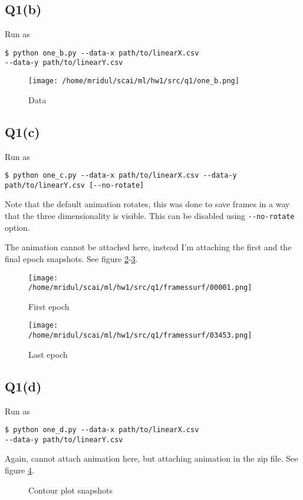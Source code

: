 \documentclass[11pt]{article}
\begin{document}
\subsection{Q1(b)}
\label{sec:org2e4e985}
\begin{codebox}
Run as
\begin{verbatim}
$ python one_b.py --data-x path/to/linearX.csv
--data-y path/to/linearY.csv
\end{verbatim}
\end{codebox}
\begin{figure}[!ht]
\centering
\texttt{[image: /home/mridul/scai/ml/hw1/src/q1/one\_b.png]}
\caption{\label{fig:org2bc820c}Data}
\end{figure}
\subsection{Q1(c)}
\label{sec:org2afdae8}
\begin{codebox}
Run as
\begin{verbatim}
$ python one_c.py --data-x path/to/linearX.csv --data-y
path/to/linearY.csv [--no-rotate]
\end{verbatim}
Note that the default animation rotates, this was done to
save frames in a way that the three dimensionality is
visible. This can be disabled using \verb|--no-rotate|
option.\par
\end{codebox}
\noindent The animation cannot be attached here, instead I'm attaching the first
and the final epoch snapshots. See figure \ref{fig:org1c0d57c}-\ref{fig:orgc4a9d5e}.
\begin{figure}[!ht]
\centering
\texttt{[image: /home/mridul/scai/ml/hw1/src/q1/framessurf/00001.png]}
\caption{\label{fig:org1c0d57c}First epoch}
\end{figure}
\begin{figure}[!ht]
\centering
\texttt{[image: /home/mridul/scai/ml/hw1/src/q1/framessurf/03453.png]}
\caption{\label{fig:orgc4a9d5e}Last epoch}
\end{figure}
\afterpage{\clearpage}
\subsection{Q1(d)}
\label{sec:org9368090}
\begin{codebox}
Run as
\begin{verbatim}
$ python one_d.py --data-x path/to/linearX.csv
--data-y path/to/linearY.csv
\end{verbatim}
\end{codebox}
\noindent Again, cannot attach animation here, but attaching animation in the
zip file. See figure \ref{fig:contours}.
\begin{figure}[!ht]
\centering
	\caption{\label{fig:contours}Contour plot snapshots}
\end{figure}
\end{document}

